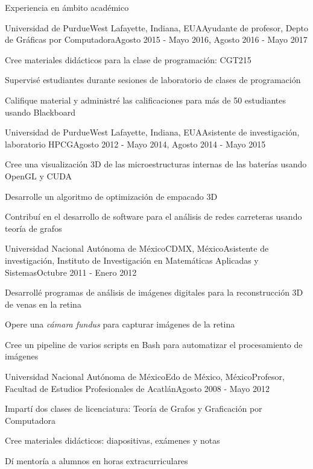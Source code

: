 \documentclass{resume} %
\begin{document}
\begin{rSection}{Experiencia en ámbito académico}

	\begin{rSubsection}{Universidad de Purdue}{West Lafayette, Indiana, EUA}{Ayudante de profesor, Depto de Gráficas por Computadora}{Agosto 2015 - Mayo 2016, Agosto 2016 - Mayo 2017}
	\item Cree materiales didácticos para la clase de programación: CGT215
	\item Supervisé estudiantes durante sesiones de laboratorio de clases de programación
	\item Califique material y administré las calificaciones para más de 50 estudiantes usando Blackboard
	\end{rSubsection}

	\begin{rSubsection}{Universidad de Purdue}{West Lafayette, Indiana, EUA}{Asistente de investigación, laboratorio HPCG}{Agosto 2012 - Mayo 2014, Agosto 2014 - Mayo 2015}
	\item Cree una visualización 3D de las microestructuras internas de las baterías usando OpenGL y CUDA
	\item Desarrolle un algoritmo de optimización de empacado 3D
	\item Contribuí en el desarrollo de software para el análisis de redes carreteras usando teoría de grafos
	\end{rSubsection}
	
	\begin{rSubsection}{Universidad Nacional Autónoma de México}{CDMX, México}{Asistente de investigación, Instituto de Investigación en Matemáticas Aplicadas y Sistemas}{Octubre 2011 - Enero 2012}
	\item Desarrollé programas de análisis de imágenes digitales para la reconstrucción 3D de venas en la retina
	\item Opere una \emph{cámara fundus} para capturar imágenes de la retina
	\item Cree un pipeline de varios scripts en Bash para automatizar el procesamiento de imágenes
	\end{rSubsection}
	
	\begin{rSubsection}{Universidad Nacional Autónoma de México}{Edo de México, México}{Profesor, Facultad de Estudios Profesionales de Acatlán}{Agosto 2008 - Mayo 2012}
	\item Impartí dos clases de licenciatura: Teoría de Grafos y Graficación por Computadora
	\item Cree materiales didácticos: diapositivas, exámenes y notas
	\item Dí mentoría a alumnos en horas extracurriculares
	\end{rSubsection}
	

\end{rSection}
\end{document}
